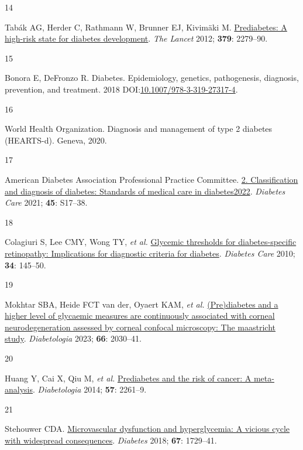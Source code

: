 \documentclass[
  a4paper,
  headsepline=true,
  open=left]{scrbook}
\newlength{\cslhangindent}
\newlength{\csllabelwidth}
\newlength{\cslentryspacingunit} %
\newenvironment{CSLReferences}[2] %
 {%
  \setlength{\parindent}{0pt}
  \ifodd #1
  \let\oldpar\par
  \def\par{\hangindent=\cslhangindent\oldpar}
  \fi
  \setlength{\parskip}{#2\cslentryspacingunit}
 }%
 {}
\newcommand{\CSLLeftMargin}[1]{\parbox[t]{\csllabelwidth}{#1}}
\newcommand{\CSLRightInline}[1]{\parbox[t]{\linewidth - \csllabelwidth}{#1}\break}
\begin{document}
\begin{CSLReferences}{0}{0}
\leavevmode{}%
\CSLLeftMargin{14 }%
\CSLRightInline{Tabák AG, Herder C, Rathmann W, Brunner EJ, Kivimäki M.
\href{https://doi.org/10.1016/S0140-6736(12)60283-9}{Prediabetes: A
high-risk state for diabetes development}. \emph{The Lancet} 2012;
\textbf{379}: 2279--90.}

\leavevmode{}%
\CSLLeftMargin{15 }%
\CSLRightInline{Bonora E, DeFronzo R. Diabetes. Epidemiology, genetics,
pathogenesis, diagnosis, prevention, and treatment. 2018
DOI:\href{https://doi.org/10.1007/978-3-319-27317-4}{10.1007/978-3-319-27317-4}.}

\leavevmode{}%
\CSLLeftMargin{16 }%
\CSLRightInline{World Health Organization. Diagnosis and management of
type 2 diabetes (HEARTS-d). Geneva, 2020.}

\leavevmode{}%
\CSLLeftMargin{17 }%
\CSLRightInline{American Diabetes Association Professional Practice
Committee. \href{https://doi.org/10.2337/dc22-S002}{2. Classification
and diagnosis of diabetes: Standards of medical care in
diabetes{\textemdash}2022}. \emph{Diabetes Care} 2021; \textbf{45}:
S17--38.}

\leavevmode{}%
\CSLLeftMargin{18 }%
\CSLRightInline{Colagiuri S, Lee CMY, Wong TY, \emph{et al.}
\href{https://doi.org/10.2337/dc10-1206}{Glycemic thresholds for
diabetes-specific retinopathy: Implications for diagnostic criteria for
diabetes}. \emph{Diabetes Care} 2010; \textbf{34}: 145--50.}

\leavevmode{}%
\CSLLeftMargin{19 }%
\CSLRightInline{Mokhtar SBA, Heide FCT van der, Oyaert KAM, \emph{et
al.} \href{https://doi.org/10.1007/s00125-023-05986-5}{(Pre)diabetes and
a higher level of glycaemic measures are continuously associated with
corneal neurodegeneration assessed by corneal confocal microscopy: The
maastricht study}. \emph{Diabetologia} 2023; \textbf{66}: 2030--41.}

\leavevmode{}%
\CSLLeftMargin{20 }%
\CSLRightInline{Huang Y, Cai X, Qiu M, \emph{et al.}
\href{https://doi.org/10.1007/s00125-014-3361-2}{Prediabetes and the
risk of cancer: A meta-analysis}. \emph{Diabetologia} 2014; \textbf{57}:
2261--9.}

\leavevmode{}%
\CSLLeftMargin{21 }%
\CSLRightInline{Stehouwer CDA.
\href{https://doi.org/10.2337/dbi17-0044}{Microvascular dysfunction and
hyperglycemia: A vicious cycle with widespread consequences}.
\emph{Diabetes} 2018; \textbf{67}: 1729--41.}


\end{CSLReferences}
\end{document}
